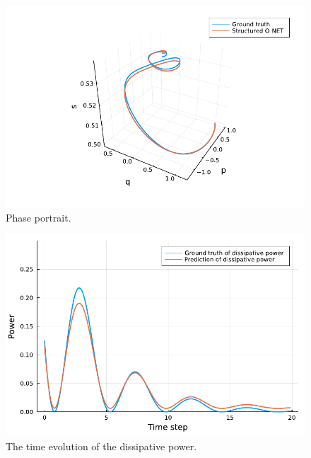 \documentclass[
	parskip, 			   %
	twoside, 			   %
	DIV=14, 			   %
	BCOR=15.0mm, 		   %
	headsepline, 		   %
	open=right, 		   %
	captions=tableheading, %
	bibliography=totoc,    %
	numbers=noenddot       %
]{scrreprt}
\begin{document}
\begin{figure}[h!]
    \centering
    \includegraphics[scale=1]{figures/idho_phase_portrait.pdf}
    \caption{Phase portrait.}
    \label{fig:idho_phase_portrait}
\end{figure}

\clearpage
\begin{figure}[h!]
    \centering
    \includegraphics[scale=1]{figures/idho_dissipative_power.pdf}
    \caption{The time evolution of the dissipative power.}
    \label{fig:idho_dissipative_power}
\end{figure}
\end{document}

